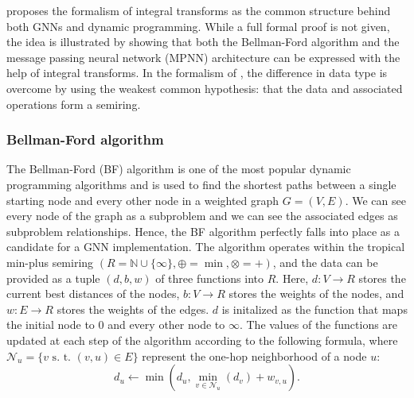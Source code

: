 \documentclass[11pt,a4paper,openright,twoside]{report}
\theoremstyle{plain}
\theoremstyle{definition}
\begin{document}
\cite{dudzik2022graph} proposes the formalism of integral transforms as the common structure behind both GNNs and dynamic programming. While a full formal proof is not given, the idea is illustrated by showing that both the Bellman-Ford algorithm and the message passing neural network (MPNN) architecture can be expressed with the help of integral transforms. In the formalism of \cite{dudzik2022graph}, the difference in data type is overcome by using the weakest common hypothesis: that the data and associated operations form a semiring.


\subsubsection{Bellman-Ford algorithm}

The Bellman-Ford (BF) algorithm is one of the most popular dynamic programming algorithms and is used to find the shortest paths between a single starting node and every other node in a weighted graph $G = (V, E)$. We can see every node of the graph as a subproblem and we can see the associated edges as subproblem relationships. Hence, the BF algorithm perfectly falls into place as a candidate for a GNN implementation. The algorithm operates within the tropical min-plus semiring $(R = \mathbb{N} \cup \{\infty\}, \oplus = \min, \otimes = +)$, and the data can be provided as a tuple $(d, b, w)$ of three functions into $R$. Here, $d: V \to R$ stores the current best distances of the nodes, $b: V \to R$ stores the weights of the nodes, and $w: E \to R$ stores the weights of the edges. $d$ is initalized as the function that maps the initial node to $0$ and every other node to $\infty$. The values of the functions are updated at each step of the algorithm according to the following formula, where $\mathcal{N}_u = \{v \text{ s. t. } (v,u) \in E\}$ represent the one-hop neighborhood of a node $u$:
\[d_u \longleftarrow  \min\left(d_u, \min_{v \in \mathcal{N}_u}(d_v) + w_{v,u}\right).\]
\end{document}

